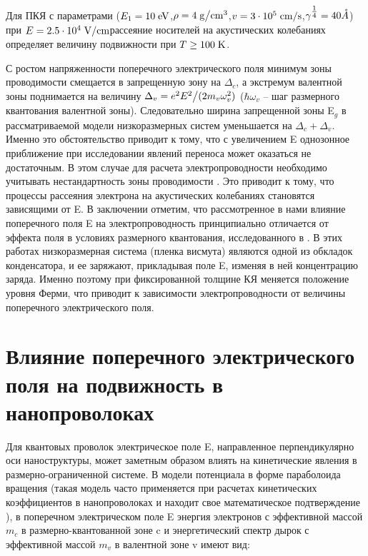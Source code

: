 Для ПКЯ с параметрами ($E_{1} =10{\rm \; eV}$,$\rho =4{\rm \; }{{\rm g} \mathord{\left/{\vphantom{{\rm g} {\rm cm}^{{\rm 3}} }}\right.\kern-\nulldelimiterspace} {\rm cm}^{{\rm 3}} } $,$v=3\cdot 10^{5} {\rm \; }{{\rm cm} \mathord{\left/{\vphantom{{\rm cm} {\rm s}}}\right.\kern-\nulldelimiterspace} {\rm s}} $,$\gamma ^{{\tfrac{1}{4}} } =40 \AA$) при $E=2.5\cdot 10^{4} {\rm \; V/cm}$рассеяние носителей на акустических колебаниях определяет величину подвижности при $T\ge 100{\rm \; K}$.

С ростом напряженности поперечного электрического поля минимум зоны проводимости смещается в запрещенную зону на $\Delta _{c} $, а экстремум валентной зоны поднимается на величину $\Delta _{v} ={e^{2} E^{2}  \mathord{\left/{\vphantom{e^{2} E^{2}  (2m_{v} }}\right.\kern-\nulldelimiterspace} (2m_{v} } \omega _{v}^{2} )$ ($\hbar \omega _{v} $ -- шаг размерного квантования валентной зоны). Следовательно ширина запрещенной зоны E${}_{g}$ в рассматриваемой модели низкоразмерных систем уменьшается на $\Delta _{c} +\Delta _{v} $. Именно это обстоятельство приводит к тому, что с увеличением E однозонное приближение при исследовании явлений переноса может оказаться не достаточным. В этом случае для расчета электропроводности необходимо учитывать нестандартность зоны проводимости \cite{Lax1960,Cohen1961}. Это приводит к тому, что процессы рассеяния электрона на акустических колебаниях становятся зависящими от E. В заключении отметим, что рассмотренное в нами влияние поперечного поля E на электропроводность принципиально отличается от эффекта поля в условиях размерного квантования, исследованного в \cite{Sandomirsky1967,Butenko1998}. В этих работах низкоразмерная система (пленка висмута) являются одной из обкладок конденсатора, и ее заряжают, прикладывая поле E, изменяя в ней концентрацию заряда. Именно поэтому при фиксированной толщине КЯ меняется положение уровня Ферми, что приводит к зависимости электропроводности от величины поперечного электрического поля.

\section{Влияние поперечного электрического поля на подвижность в нанопроволоках} \label{sect4_2}

Для квантовых проволок электрическое поле E, направленное перпендикулярно оси наноструктуры, может заметным образом влиять на кинетические явления в размерно-ограниченной системе. В модели потенциала в форме параболоида вращения (такая модель часто применяется при расчетах кинетических коэффициентов в нанопроволоках \cite{Geiler1998,Cros1992} и находит свое математическое подтверждение \cite{Beenakker1991}), в поперечном электрическом поле E энергия электронов с эффективной массой $m_{c} $ в размерно-квантованной зоне c и энергетический спектр дырок с эффективной массой $m_{v} $ в валентной зоне v имеют вид:

